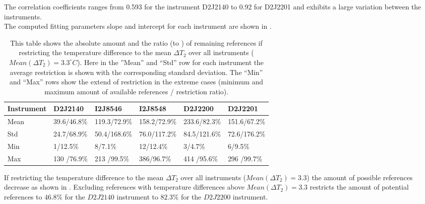 The correlation coefficients ranges from 0.593 for the instrument D2J2140 to  0.92 for D2J2201 and exhibits a large variation between the instruments. \\
The computed fitting parameters slope and intercept for each instrument are shown in .\\
\begin{table}
	\centering
	\begin{tabular}{|p{1.8cm}|p{2.15cm}|p{2.15cm}|p{2.15cm}|p{2.15cm}|p{2.15cm}|}
		Instrument	&D2J2140&I2J8546& I2J8548&D2J2200&D2J2201\\
		\toprule
		Mean&
		39.6/46.8\%&
		119.3/72.9\%
		&158.2/72.9\%
		&233.6/82.3\%
		&151.6/67.2\%\\
		\midrule
		Std&
		24.7/68.9\%&
		50.4/168.6\%&
		76.0/117.2\%&
		84.5/121.6\%&
		72.6/176.2\%\\
		\midrule
		Min&
		1/12.5\%
		&8/7.1\%&
		12/12.4\%&
		3/4.7\% &
		6/9.5\%\\
		\midrule
		Max
		&
		130	/76.9\%&
		213	/99.5\%&
		386/96.7\%&
		414	/95.6\% &
		296	/99.7\%\\
		\bottomrule
	\end{tabular}
	\caption{This table shows the absolute amount and the ratio (to ) of remaining references if restricting the temperature difference to the mean $\Delta T_{2}$ over all instruments ($Mean(\Delta T_{2}) = 3.3^{\circ}C$). Here in the ”Mean” and “Std” row for each  instrument the average restriction is shown with the corresponding standard deviation. The “Min” and “Max” rows show the extend of restriction in the extreme cases (minimum and maximum amount of available references / restriction ratio).}
	\label{tab:decTemp}
\end{table}	
If restricting the temperature difference to the mean $\Delta T_{2}$ over all instruments ($Mean(\Delta T_{2}) = 3.3$) the amount of possible references decrease as shown in . Excluding references with temperature differences above $Mean(\Delta T_{2}) = 3.3$ restricts the amount of potential references to $46.8\%$ for the $D2J2140$ instrument to $82.3\%$ for the $D2J2200$ instrument.

